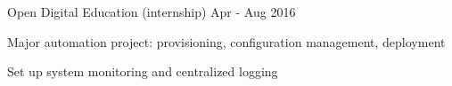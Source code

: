 \begin{cventries}

\cventry
{} %
{Open Digital Education (internship)} %
{Apr - Aug 2016} %
{} %
{ %
\begin{cvitems}
\item {Major automation project: provisioning, configuration management, deployment}
\item {Set up system monitoring and centralized logging}
\end{cvitems}
}



\end{cventries}
